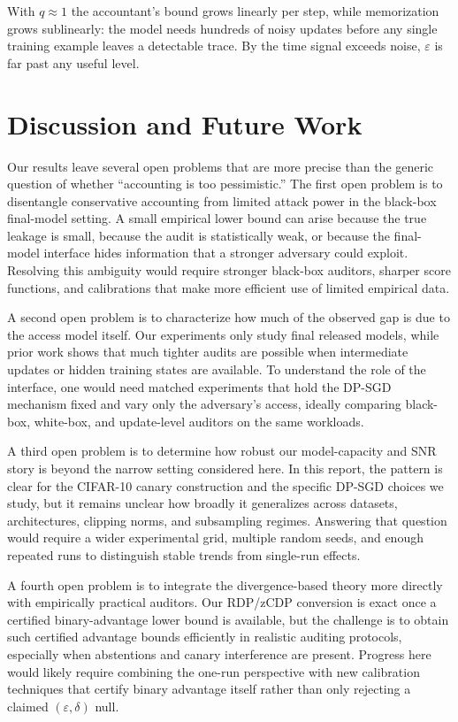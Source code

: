 \documentclass[10pt]{article}
\newcommand{\eps}{\varepsilon}
\newcommand{\del}{\delta}
\begin{document}
With $q \approx 1$ the accountant's bound grows linearly per step, while memorization grows sublinearly: the model needs hundreds of noisy updates before any single training example leaves a detectable trace. By the time signal exceeds noise, $\eps$ is far past any useful level.


\section{Discussion and Future Work}

Our results leave several open problems that are more precise than the generic question of whether ``accounting is too pessimistic.'' The first open problem is to disentangle conservative accounting from limited attack power in the black-box final-model setting. A small empirical lower bound can arise because the true leakage is small, because the audit is statistically weak, or because the final-model interface hides information that a stronger adversary could exploit. Resolving this ambiguity would require stronger black-box auditors, sharper score functions, and calibrations that make more efficient use of limited empirical data.

A second open problem is to characterize how much of the observed gap is due to the access model itself. Our experiments only study final released models, while prior work shows that much tighter audits are possible when intermediate updates or hidden training states are available. To understand the role of the interface, one would need matched experiments that hold the DP-SGD mechanism fixed and vary only the adversary's access, ideally comparing black-box, white-box, and update-level auditors on the same workloads.

A third open problem is to determine how robust our model-capacity and SNR story is beyond the narrow setting considered here. In this report, the pattern is clear for the CIFAR-10 canary construction and the specific DP-SGD choices we study, but it remains unclear how broadly it generalizes across datasets, architectures, clipping norms, and subsampling regimes. Answering that question would require a wider experimental grid, multiple random seeds, and enough repeated runs to distinguish stable trends from single-run effects.

A fourth open problem is to integrate the divergence-based theory more directly with empirically practical auditors. Our RDP/zCDP conversion is exact once a certified binary-advantage lower bound is available, but the challenge is to obtain such certified advantage bounds efficiently in realistic auditing protocols, especially when abstentions and canary interference are present. Progress here would likely require combining the one-run perspective with new calibration techniques that certify binary advantage itself rather than only rejecting a claimed $(\eps,\del)$ null.
\end{document}
